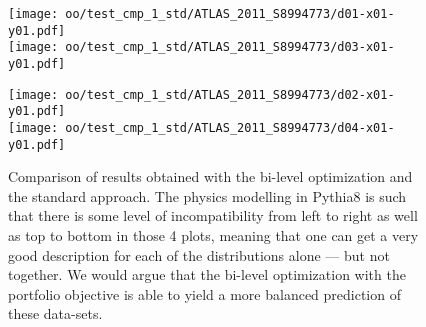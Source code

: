  

\begin{figure}[!h]
\centering
    \begin{minipage}{.48\textwidth}%
        \begin{center}
            \texttt{[image: oo/test\_cmp\_1\_std/ATLAS\_2011\_S8994773/d01-x01-y01.pdf]}\\
            \texttt{[image: oo/test\_cmp\_1\_std/ATLAS\_2011\_S8994773/d03-x01-y01.pdf]}
        \end{center}
    \end{minipage}%
    \begin{minipage}{.04\textwidth}%
    \end{minipage}%
    \begin{minipage}{.48\textwidth}%
        \begin{center}
            \texttt{[image: oo/test\_cmp\_1\_std/ATLAS\_2011\_S8994773/d02-x01-y01.pdf]}\\
            \texttt{[image: oo/test\_cmp\_1\_std/ATLAS\_2011\_S8994773/d04-x01-y01.pdf]}
        \end{center}
    \end{minipage}%
    \caption{Comparison of results obtained with the bi-level optimization and the standard approach. The physics modelling in Pythia8 is such that there is some level of incompatibility from left to right as well as top to bottom in those 4 plots, meaning that one can get a very good description for each of the distributions alone --- but not together. We would argue that the bi-level optimization with the portfolio objective is able to yield a more balanced prediction of these data-sets.}
\label{fig-oocmp} 

\end{figure}




